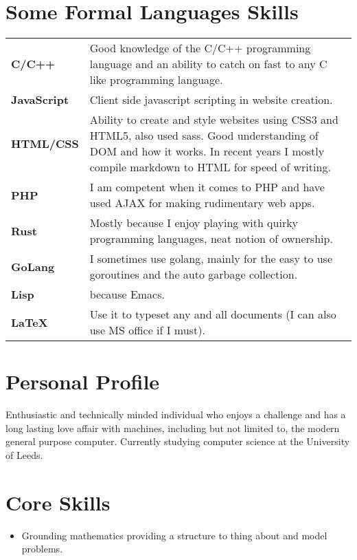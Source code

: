 \documentclass[10pt,a4paper]{article}
\begin{document}
\begin{multicols*}{2}
  \section*{Some Formal Languages Skills}
\begin{center}
  \begin{tabular}{p{2cm} p{6cm}}
  \textbf{C/C++}&Good knowledge of the C/C++ programming language and an ability to catch on fast to any C like programming language.\\[.1cm]
  \textbf{JavaScript}&Client side javascript scripting in website creation.\\[.1cm]
  \textbf{HTML/CSS}&Ability to create and style websites using CSS3 and HTML5, also used sass. Good understanding of DOM and how it works. In recent years I mostly compile markdown to HTML for speed of writing.\\[.1cm]
  \textbf{PHP}&I am competent when it comes to PHP and have used AJAX for making rudimentary web apps.\\[.1cm]
  \textbf{Rust}&Mostly because I enjoy playing with quirky programming languages, neat notion of ownership.\\[.1cm]
  \textbf{GoLang}&I sometimes use golang, mainly for the easy to use goroutines and the auto garbage collection.\\[.1cm]
  \textbf{Lisp}&because Emacs.\\[.1cm]
  \textbf{\LaTeX}&Use it to typeset any and all documents (I can also use MS office if I must).\\
  \end{tabular}
\end{center}

\section*{Personal Profile}
Enthusiastic and technically minded individual who enjoys a challenge and has a long lasting love affair with machines, including but not limited to, the modern general purpose computer.
Currently studying computer science at the University of Leeds.

\section*{Core Skills}
\begin{itemize}
\item Grounding mathematics providing a structure to thing about and model problems.


\end{itemize}
\end{multicols*}
\end{document}

